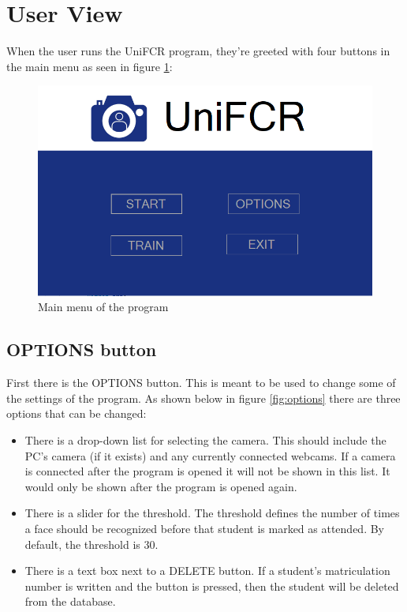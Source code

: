 \documentclass[12pt, a4paper]{article}
\begin{document}
\section{User View}
When the user runs the UniFCR program, they're greeted with four buttons in the main menu as seen in figure \ref{fig:menu}:
\begin{figure}[h!]
	\centering
		\includegraphics[width=1.0\columnwidth]{images/menu}
	\caption{Main menu of the program}
	\label{fig:menu}
\end{figure}
\subsection{OPTIONS button}
First there is the OPTIONS button. This is meant to be used to change some of the settings of the program. As shown below in figure \ref{fig:options} there are three options that can be changed:
\begin{itemize}
\item There is a drop-down list for selecting the camera. This should include the PC’s camera (if it exists) and any currently connected webcams. If a camera is connected after the program is opened it will not be shown in this list. It would only be shown after the program is opened again. 
\item There is a slider for the threshold. The threshold defines the number of times a face should be recognized before that student is marked as attended. By default, the threshold is 30.
\item There is a text box next to a DELETE button. If a student’s matriculation number is written and the button is pressed, then the student will be deleted from the database.
\end{itemize}
\end{document}
